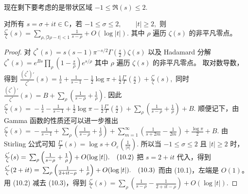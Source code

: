 现在剩下要考虑的是带状区域
\(\textstyle -1\leq\allowbreak{} \Re(s)\leq\allowbreak{} 2.\)

\begin{lemma}[原文 Lemma 10.1]
	对所有 $s=\sigma+it\in\mathbb C$，若
	\(\textstyle -1\leq\allowbreak{} \sigma\leq\allowbreak{} 2,\allowbreak{} \qquad |t|\geq\allowbreak{} 2,\allowbreak{}\)
	则
	\(\textstyle \frac{\zeta'}{\zeta}(s) =\allowbreak{} \sum_{\rho,\allowbreak{} |\Im\rho-t|<1} \frac1{s-\rho} +\allowbreak{} O(\log |t|).\)
		其中 $\rho$ 遍历 $\zeta(s)$ 的非平凡零点。
	\end{lemma}

	\begin{proof}
		对
	\(\textstyle \zeta^*(s) =\allowbreak{} s(s-1)\pi^{-s/2}\Gamma\left(\frac{s}{2}\right)\zeta(s)\)
	以及 Hadamard 分解
	\(\textstyle \zeta^*(s) =\allowbreak{} e^{Bs}\prod_\rho \left(1-\frac{s}{\rho}\right)e^{s/\rho}\)
		其中 $\rho$ 遍历 $\zeta(s)$ 的非平凡零点。
			取对数导数，得到
	\(\textstyle \frac{(\zeta^*)'}{\zeta^*}(s) =\allowbreak{} \frac1s+\allowbreak{}\frac1{s-1} -\frac12\log\pi +\allowbreak{}\frac12\frac{\Gamma'}{\Gamma}\left(\frac{s}{2}\right) +\allowbreak{} \frac{\zeta'}{\zeta}(s),\allowbreak{}\)
	同时
	\(\textstyle \frac{(\zeta^*)'}{\zeta^*}(s) =\allowbreak{} B+\allowbreak{} \sum_\rho \left(\frac1{s-\rho}+\allowbreak{}\frac1{\rho}\right).\)
	因此
	\(\textstyle \frac{\zeta'}{\zeta}(s) =\allowbreak{} -\frac1s-\frac1{s-1} +\allowbreak{}\frac12\log\pi -\frac12\frac{\Gamma'}{\Gamma}\left(\frac{s}{2}\right) +\allowbreak{} \sum_\rho \left(\frac1{s-\rho}+\allowbreak{}\frac1{\rho}\right) +\allowbreak{} B.\)
	顺便记下，由 Gamma 函数的性质还可以进一步推出
	\(\textstyle \frac{\zeta'}{\zeta}(s) =\allowbreak{} -\frac1{s-1} +\allowbreak{} \sum_\rho \left(\frac1{s-\rho}+\allowbreak{}\frac1{\rho}\right) +\allowbreak{} \sum_{m=\allowbreak{}1}^{\infty} \left(\frac1{s+\allowbreak{}2m}-\frac1{2m}\right) +\allowbreak{} \frac{\log\pi}{2} +\allowbreak{} B.\)
	由 Stirling 公式可知
	\(\textstyle \frac{\Gamma'}{\Gamma}(s) =\allowbreak{} \log s+\allowbreak{}O_\varepsilon\left(\frac1{|s|}\right).\)
	所以当 $-1\leq\sigma\leq 2$ 且 $|t|\geq2$ 时，
	\(\textstyle \frac{\zeta'}{\zeta}(s) =\allowbreak{} \sum_\rho \left(\frac1{s-\rho}+\allowbreak{}\frac1{\rho}\right) +\allowbreak{} O(\log |t|). \quad\textup{(10.2)}\)
	把 $s=2+it$ 代入，得到
	\(\textstyle \frac{\zeta'}{\zeta}(2+\allowbreak{}it) =\allowbreak{} \sum_\rho \left(\frac1{2+\allowbreak{}it-\rho}+\allowbreak{}\frac1{\rho}\right) +\allowbreak{} O(\log |t|). \quad\textup{(10.3)}\)
	而由 (10.1)，左端是 $O(1)$。用 (10.2) 减去 (10.3)，得到
	\(\textstyle \frac{\zeta'}{\zeta}(s) =\allowbreak{} \sum_\rho \left( \frac1{s-\rho} - \frac1{2+\allowbreak{}it-\rho} \right) +\allowbreak{} O(\log |t|).\)


\end{proof}
